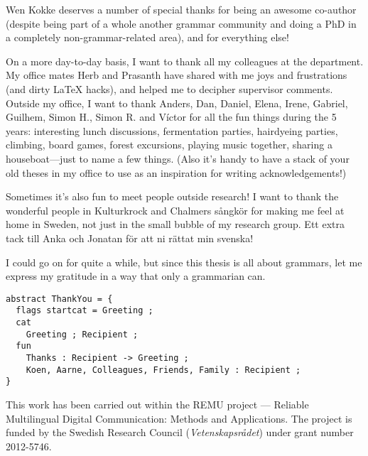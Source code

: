 Wen Kokke deserves a number of special thanks for being an awesome
co-author (despite being part of a whole another grammar community and
doing a PhD in a completely non-grammar-related area), and for everything else!

On a more day-to-day basis, I want to thank all my colleagues at the
department. My office mates Herb and Prasanth have shared with me joys
and frustrations (and dirty \LaTeX{} hacks), and helped me to decipher
supervisor comments. Outside my office, I want to thank Anders, Dan,
Daniel, Elena, Irene, Gabriel, Guilhem, Simon H., Simon R. and Víctor
for all the fun things during the 5 years: interesting lunch
discussions, fermentation parties, hairdyeing parties, climbing, board
games, forest excursions, playing music together, sharing a
houseboat---just to name a few things. (Also it's handy to have a
stack of your old theses in my office to use as an inspiration for
writing acknowledgements!)

Sometimes it's also fun to meet people outside research! I want to
thank the wonderful people in Kulturkrock and Chalmers sångkör for
making me feel at home in Sweden, not just in the small bubble of my
research group. Ett extra tack till Anka och Jonatan för att ni rättat
min svenska!

I could go on for quite a while, but since this thesis is all about
grammars, let me express my gratitude in a way that only a grammarian can.

\begin{verbatim}
abstract ThankYou = {
  flags startcat = Greeting ;
  cat 
    Greeting ; Recipient ;
  fun
    Thanks : Recipient -> Greeting ;
    Koen, Aarne, Colleagues, Friends, Family : Recipient ;
}
\end{verbatim}


\vfill\noindent
This work has been carried out within the REMU project — Reliable Multilingual Digital Communication: Methods and Applications.
The project is funded by the Swedish Research Council (\emph{Vetenskapsrådet}) under grant number 2012-5746.
